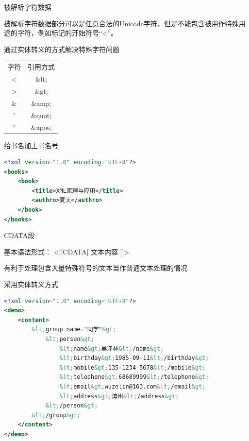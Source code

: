 \begin{frame}{被解析字符数据}
\par 被解析字符数据部分可以是任意合法的Unicode字符，但是不能包含被用作特殊用途的字符，例如标记的开始符号“<”。
\par 通过实体转义的方式解决特殊字符问题
\begin{center}
    \begin{tabular}{|c|c|}
    \Xhline{1.3pt}
    字符 &    引用方式 \\
    \Xhline{1.3pt}
     < & \&lt;  \\
     \hline
     > & \&gt;  \\
    \hline
    \& & \&amp;  \\
    \hline
    ' & \&quot;  \\
    \hline
    " & \&apos;  \\
    \hline
    \end{tabular}
\end{center}
\end{frame}


\begin{frame}[fragile]{给书名加上书名号}
\begin{lstlisting}[tabsize=8, basicstyle=\small\tt, language=XML]
<?xml version="1.0" encoding="UTF-8"?>
<books>
    <book>
        <title>XML原理与应用</title>
        <authro>夏天</authro>    
    </book>
</books>
\end{lstlisting}
\end{frame}


\begin{frame}{CDATA段}
\begin{shaded} 
\par 基本语法形式： <![CDATA[ 文本内容 ]]>
\par 有利于处理包含大量特殊符号的文本当作普通文本处理的情况
\end{shaded}
\end{frame}

\begin{frame}[fragile]{采用实体转义方式}
\begin{lstlisting}[tabsize=8, basicstyle=\small\tt, language=XML]
<?xml version="1.0" encoding="UTF-8"?>
<demo>
    <content>
        &lt;group name="同学"&gt;
            &lt;person&gt;
                &lt;name&gt;吴泽林&lt;/name&gt;
                &lt;birthday&gt;1985-09-11&lt;/birthday&gt;
                &lt;mobile&gt;135-1234-5678&lt;/mobile&gt;
                &lt;telephone&gt;68689999&lt;/telephone&gt;
                &lt;email&gt;wuzelin@163.com&lt;/email&gt;
                &lt;address&gt;漳州&lt;/address&gt;
            &lt;/person&gt;
        &lt;/group&gt;
    </content>
</demo>
\end{lstlisting}
\end{frame}

